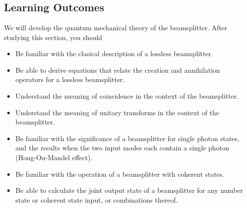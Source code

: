 \documentclass[a4paper, 11pt, normalem]{report}
\begin{document}
\chapter{}
\section{Learning Outcomes}
We will develop the quantum mechanical theory of the beamsplitter. 
After studying this section, you should
\begin{itemize}
    \item Be familiar with the clasical description of a lossless beamsplitter.
    \item Be able to derive equations that relate the creation and annihilation operators for a lossless beamsplitter.
    \item Understand the meaning of coincidence in the context of the beamsplitter. 
    \item Understand the meaning of unitary transforms in the context of the beamsplitter. 
    \item Be familiar with the significance of a beamsplitter for single photon states, and the results when the two input modes each contain a single photon (Hong-Ou-Mandel effect).
    \item Be familiar with the operation of a beamsplitter with coherent states. 
    \item Be able to calculate the joint output state of a beamsplitter for any number state or coherent state input, or combinations thereof. 
\end{itemize}
\end{document}
